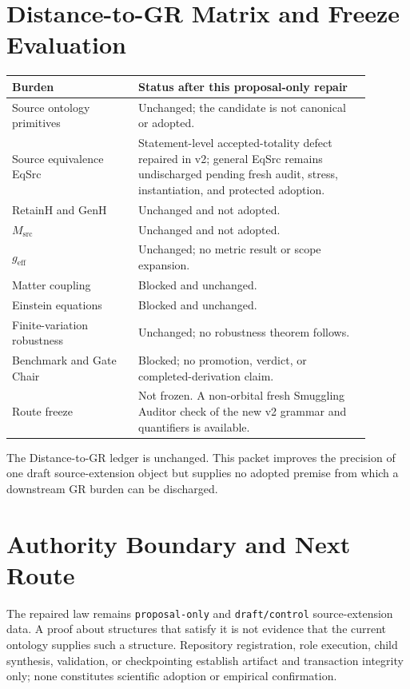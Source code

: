 \documentclass[11pt]{article}
\begin{document}
\section{Distance-to-GR Matrix and Freeze Evaluation}

\begin{longtable}{p{0.31\linewidth}p{0.58\linewidth}}
\toprule
Burden & Status after this proposal-only repair \\
\midrule
Source ontology primitives & Unchanged; the candidate is not canonical or adopted. \\
Source equivalence EqSrc & Statement-level accepted-totality defect repaired in v2; general EqSrc remains undischarged pending fresh audit, stress, instantiation, and protected adoption. \\
RetainH and GenH & Unchanged and not adopted. \\
\(M_{\mathrm{src}}\) & Unchanged and not adopted. \\
\(g_{\mathrm{eff}}\) & Unchanged; no metric result or scope expansion. \\
Matter coupling & Blocked and unchanged. \\
Einstein equations & Blocked and unchanged. \\
Finite-variation robustness & Unchanged; no robustness theorem follows. \\
Benchmark and Gate Chair & Blocked; no promotion, verdict, or completed-derivation claim. \\
Route freeze & Not frozen. A non-orbital fresh Smuggling Auditor check of the new v2 grammar and quantifiers is available. \\
\bottomrule
\end{longtable}

The Distance-to-GR ledger is unchanged. This packet improves the precision of
one draft source-extension object but supplies no adopted premise from which a
downstream GR burden can be discharged.

\section{Authority Boundary and Next Route}

The repaired law remains \texttt{proposal-only} and
\texttt{draft/control} source-extension data. A proof about structures that
satisfy it is not evidence that the current ontology supplies such a
structure. Repository registration, role execution, child synthesis,
validation, or checkpointing establish artifact and transaction integrity
only; none constitutes scientific adoption or empirical confirmation.
\end{document}
